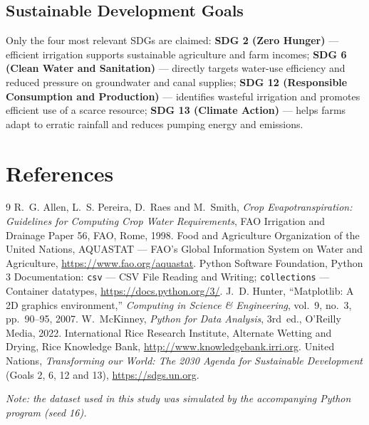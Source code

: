\documentclass[11pt,a4paper]{article}
\begin{document}
\subsection{Sustainable Development Goals}
Only the four most relevant SDGs are claimed: \textbf{SDG 2 (Zero Hunger)} ---
efficient irrigation supports sustainable agriculture and farm incomes;
\textbf{SDG 6 (Clean Water and Sanitation)} --- directly targets water-use efficiency
and reduced pressure on groundwater and canal supplies; \textbf{SDG 12 (Responsible
Consumption and Production)} --- identifies wasteful irrigation and promotes efficient
use of a scarce resource; \textbf{SDG 13 (Climate Action)} --- helps farms adapt to
erratic rainfall and reduces pumping energy and emissions.

\section*{References}
\begin{thebibliography}{9}
 R.~G. Allen, L.~S. Pereira, D.~Raes and M.~Smith,
  \emph{Crop Evapotranspiration: Guidelines for Computing Crop Water Requirements},
  FAO Irrigation and Drainage Paper 56, FAO, Rome, 1998.
 Food and Agriculture Organization of the United Nations,
  AQUASTAT --- FAO's Global Information System on Water and Agriculture,
  \url{https://www.fao.org/aquastat}.
 Python Software Foundation, Python 3 Documentation:
  \texttt{csv} --- CSV File Reading and Writing; \texttt{collections} --- Container
  datatypes, \url{https://docs.python.org/3/}.
 J.~D. Hunter, ``Matplotlib: A 2D graphics environment,''
  \emph{Computing in Science \& Engineering}, vol.~9, no.~3, pp.~90--95, 2007.
 W.~McKinney, \emph{Python for Data Analysis}, 3rd~ed.,
  O'Reilly Media, 2022.
 International Rice Research Institute, Alternate Wetting and Drying,
  Rice Knowledge Bank, \url{http://www.knowledgebank.irri.org}.
 United Nations, \emph{Transforming our World: The 2030 Agenda for
  Sustainable Development} (Goals 2, 6, 12 and 13), \url{https://sdgs.un.org}.
\end{thebibliography}
\noindent\textit{Note: the dataset used in this study was simulated by the
accompanying Python program (seed 16).}

\appendix
\end{document}
